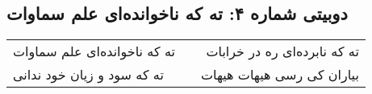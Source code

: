 \begin{center}
\section*{دوبیتی شماره ۴: ته که ناخوانده‌ای علم سماوات}
\label{sec:004}
\begin{longtable}{l p{0.5cm} r}
ته که ناخوانده‌ای علم سماوات
&&
ته که نابرده‌ای ره در خرابات
\\
ته که سود و زیان خود ندانی
&&
بیاران کی رسی هیهات هیهات
\\
\end{longtable}
\end{center}
